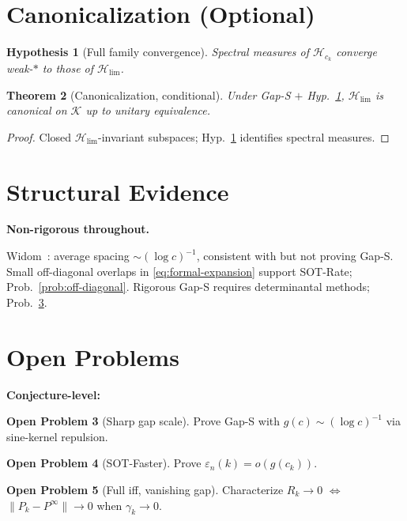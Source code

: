 \documentclass[12pt,a4paper]{amsart}
\newtheorem{theorem}{Theorem}[section]
\newtheorem{hypothesis}[theorem]{Hypothesis}
\theoremstyle{definition}
\newtheorem{problem}[theorem]{Open Problem}
\theoremstyle{remark}
\newcommand{\Hlim}{\mathcal{H}_{\lim}}
\begin{document}
\section{Canonicalization (Optional)}
\label{sec:canonical}
\begin{hypothesis}[Full family
  convergence]
\label{hyp:full-family}
Spectral measures of
$\mathcal{H}_{c_k}$ converge
weak-$*$ to those of $\Hlim$.
\end{hypothesis}
\begin{theorem}[Canonicalization,
  conditional]
\label{thm:canonical}
Under Gap-S $+$
Hyp.~\ref{hyp:full-family},
$\Hlim$ is canonical on
$\mathcal{K}$ up to unitary
equivalence.
\end{theorem}
\begin{proof}
Closed $\Hlim$-invariant subspaces;
Hyp.~\ref{hyp:full-family}
identifies spectral measures.
\end{proof}

\section{Structural Evidence}
\label{sec:heuristic}
\textbf{Non-rigorous throughout.}

Widom~\cite{Widom1964}: average
spacing $\sim(\log c)^{-1}$,
consistent with but not proving Gap-S.
Small off-diagonal overlaps in
\eqref{eq:formal-expansion} support
SOT-Rate; Prob.~\ref{prob:off-diagonal}.
Rigorous Gap-S requires determinantal
methods; Prob.~\ref{prob:sharp-gc}.

\section{Open Problems}
\label{sec:open}

\noindent\textbf{Conjecture-level:}

\begin{problem}[Sharp gap scale]
\label{prob:sharp-gc}
Prove Gap-S with
$g(c)\sim(\log c)^{-1}$
via sine-kernel repulsion.
\end{problem}

\begin{problem}[SOT-Faster]
\label{prob:sot-faster}
Prove $\varepsilon_n(k)=o(g(c_k))$.
\end{problem}

\begin{problem}[Full iff,
  vanishing gap]
\label{prob:full-iff}
Characterize $R_k\to 0$
$\Leftrightarrow$
$\|P_k-P^\infty\|\to 0$
when $\gamma_k\to 0$.
\end{problem}
\end{document}
